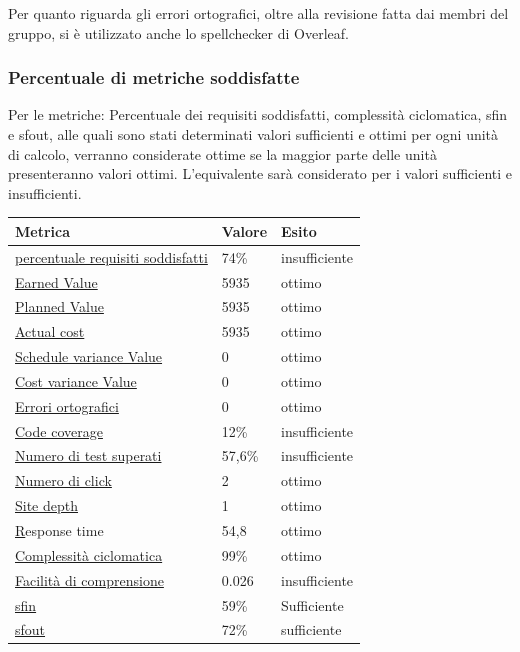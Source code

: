 Per quanto riguarda gli errori ortografici, oltre alla revisione fatta dai membri del gruppo, si è utilizzato anche lo spellchecker di Overleaf.

\newpage
\subsubsection{Percentuale di metriche soddisfatte}
    Per le metriche: Percentuale dei requisiti soddisfatti, complessità ciclomatica, sfin e sfout, alle quali sono stati determinati valori sufficienti e ottimi per ogni unità di calcolo,
    verranno considerate ottime se la maggior parte delle unità presenteranno valori ottimi. L'equivalente
    sarà considerato per i valori sufficienti e insufficienti. 


    \begin{longtabu} to \textwidth {| X[0.2,c m] | X[0.1,c m] | X[0.1,c m] |}
        \hline
        \textbf{Metrica} &
        \textbf{Valore} &
        \textbf{Esito}\\
        \hline
        \hyperlink{subsubsection.5.1.1}{percentuale requisiti soddisfatti}& 74\% & insufficiente \\ 
        \hline
        \hyperlink{subsubsection.5.1.2}{Earned Value} & 5935 & ottimo  \\ 
        \hline
        \hyperlink{subsubsection.5.1.2}{Planned Value} & 5935 & ottimo  \\
        \hline
        \hyperlink{subsubsection.5.1.2}{Actual cost} & 5935 & ottimo  \\
        \hline
        \hyperlink{subsubsection.5.1.2}{Schedule variance Value} & 0 & ottimo  \\
        \hline
        \hyperlink{subsubsection.5.1.2}{Cost variance Value} & 0 & ottimo  \\
        \hline
        \hyperlink{subsubsection.5.2.1}{Errori ortografici} & 0 & ottimo  \\
        \hline
        \hyperlink{subsubsection.5.2.4}{Code coverage} & 12\% & insufficiente \\
        \hline
        \hyperlink{subsubsection.5.2.5}{Numero di test superati} & 57,6\% & insufficiente \\
        \hline
        \hyperlink{subsubsection.5.3.1}{Numero di click} & 2 & ottimo \\
        \hline
        \hyperlink{subsubsection.5.3.2}{Site depth} & 1 & ottimo \\
        \hline
        \hyperlink{subsubsection.5.3.3}Response time & 54,8 & ottimo \\
        \hline
        \hyperlink{subsubsection.5.3.4}{Complessità ciclomatica} & 99\% & ottimo \\
        \hline
        \hyperlink{subsubsection.5.3.5}{Facilità di comprensione} & 0.026 & insufficiente \\
        \hline
        \hyperlink{subsubsection.5.3.6}{sfin} & 59\% & Sufficiente \\
        \hline
        \hyperlink{subsubsection.5.3.6}{sfout} & 72\% & sufficiente \\
        \hline
        
        \end{longtabu}

